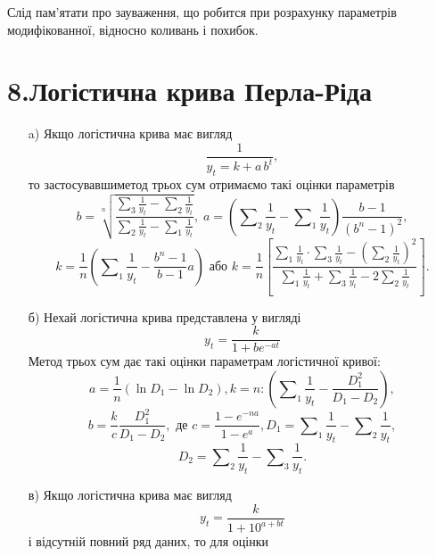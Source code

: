 \documentclass[a4paper, fontsize=10pt, oneside]{article}
\begin{document}
Слід пам'ятати про зауваження, що робится при розрахунку параметрів модифікованної, відносно коливань і похибок.

\chapter{\Large \bf 8.Логістична крива Перла-Ріда}

\begin{itemize}

\item[a)] Якщо логістична крива має вигляд $$ \frac{1}{y_{t} = k + a\,b^{t}},$$ то застосувавшиметод трьох сум отримаємо такі оцінки параметрів $$ b = \sqrt[n]{\frac{\sum_{3}\frac{1}{y_{t}} - \sum_{2}\frac{1}{y_{t}}}{\sum_{2}\frac{1}{y_{t}} - \sum_{1}\frac{1}{y_{t}}}},\; a = ( \sum\nolimits_{2} \frac{1}{y_{t}} - \sum\nolimits_{1} \frac{1}{y_{t}} ) \frac{b - 1}{(b^{n} - 1)^2},$$ $$k = \frac{1}{n} \left( \sum\nolimits_{1}\frac{1}{y_{t}} - \frac{b^{n} - 1}{b - 1}a \right) \texttt{ або } k = \frac{1}{n} \left[ \frac{\sum_{1}\frac{1}{y_{t}} \cdot \sum_{3}\frac{1}{y_{t}} - (\sum_{2}\frac{1}{y_{t}})^2}{\sum_{1} \frac{1}{y_{t}} + \sum_{3} \frac{1}{y_{t}} - 2 \sum_{2}\frac{1}{y_{t}}} \right].$$

\item[б)] Нехай логістична крива представлена у вигляді
$$y_{t} = \frac{k}{1 + b e^{-at}}$$
Метод трьох сум дає такі оцінки параметрам логістичної кривої:
$$ a = \frac{1}{n} \left( \ln{D_{1}} -  \ln{D_{2}} \right), k = n : \left( \sum\nolimits_{1} \frac{1}{y_{t}} - \frac{D_{1}^{2}}{D_{1} - D_{2}} \right),$$
$$b = \frac{k}{c}\frac{D_{1}^{2}}{D_{1} - D_{2}}, \texttt{ де } c = \frac{1 - e^{-na}}{1 - e^{a}}, D_{1} = \sum\nolimits_{1}\frac{1}{y_{t}} - \sum\nolimits_{2}\frac{1}{y_{t}},$$
$$D_{2} = \sum\nolimits_{2}\frac{1}{y_{t}} - \sum\nolimits_{3}\frac{1}{y_{t}}.$$

\item[в)] Якщо логістична крива має вигляд
$$y_{t} = \frac{k}{1 + 10^{a + bt}}$$ 
і відсутній повний ряд даних, то для оцінки

\end{itemize}
\end{document}
